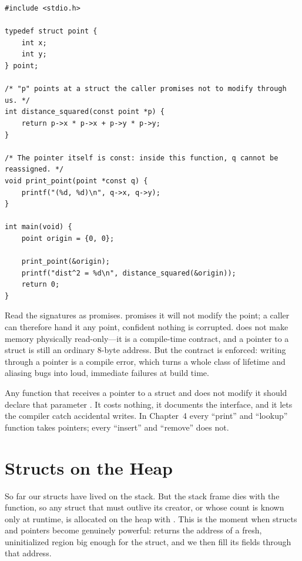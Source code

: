 \begin{lstlisting}[caption={const expresses ``read-only'' on function boundaries.}]
#include <stdio.h>

typedef struct point {
    int x;
    int y;
} point;

/* "p" points at a struct the caller promises not to modify through us. */
int distance_squared(const point *p) {
    return p->x * p->x + p->y * p->y;
}

/* The pointer itself is const: inside this function, q cannot be reassigned. */
void print_point(point *const q) {
    printf("(%d, %d)\n", q->x, q->y);
}

int main(void) {
    point origin = {0, 0};

    print_point(&origin);
    printf("dist^2 = %d\n", distance_squared(&origin));
    return 0;
}
\end{lstlisting}

Read the signatures as promises.  promises it
will not modify the point; a caller can therefore hand it any point,
confident nothing is corrupted.  does not make memory
physically read-only---it is a compile-time contract, and a
 pointer to a struct is still an ordinary 8-byte address.
But the contract is enforced: writing through a  pointer is
a compile error, which turns a whole class of lifetime and aliasing
bugs into loud, immediate failures at build time.

\begin{ruleofthumb}
Any function that receives a pointer to a struct and does not modify
it should declare that parameter . It costs nothing, it
documents the interface, and it lets the compiler catch accidental
writes. In Chapter~4 every ``print'' and ``lookup'' function takes
 pointers; every ``insert'' and ``remove'' does not.
\end{ruleofthumb}

\section{Structs on the Heap}

So far our structs have lived on the stack. But the stack frame dies
with the function, so any struct that must outlive its creator, or
whose count is known only at runtime, is allocated on the heap with
. This is the moment when structs and pointers become
genuinely powerful:  returns the address of a fresh,
uninitialized region big enough for the struct, and we then fill its
fields through that address.

